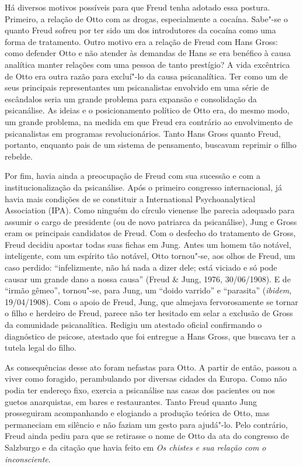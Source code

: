 Há diversos motivos possíveis para que Freud tenha adotado essa postura.
Primeiro, a relação de Otto com as drogas, especialmente a cocaína.
Sabe"-se o quanto Freud sofreu por ter sido um dos introdutores da
cocaína como uma forma de tratamento. Outro motivo era a relação de
Freud com Hans Gross: como defender Otto e não atender às demandas de
Hans se era benéfico à causa analítica manter relações com uma pessoa de
tanto prestígio? A vida excêntrica de Otto era outra razão para
excluí"-lo da causa psicanalítica. Ter como um de seus principais
representantes um psicanalistas envolvido em uma série de escândalos
seria um grande problema para expansão e consolidação da psicanálise. As
ideias e o posicionamento político de Otto era, do mesmo modo, um grande
problema, na medida em que Freud era contrário ao envolvimento de
psicanalistas em programas revolucionários. Tanto Hans Gross quanto
Freud, portanto, enquanto pais de um sistema de pensamento, buscavam
reprimir o filho rebelde.

Por fim, havia ainda a preocupação de Freud com sua sucessão e com a
institucionalização da psicanálise. Após o primeiro congresso
internacional, já havia mais condições de se constituir a International
Psychoanalytical Association (IPA). Como ninguém do círculo vienense lhe
parecia adequado para assumir o cargo de presidente (ou de novo
patriarca da psicanálise), Jung e Gross eram os principais candidatos de
Freud. Com o desfecho do tratamento de Gross, Freud decidiu apostar
todas suas fichas em Jung. Antes um homem tão notável, inteligente, com
um espírito tão notável, Otto tornou"-se, aos olhos de Freud, um caso
perdido: ``infelizmente, não há nada a dizer dele; está viciado e só
pode causar um grande dano a nossa causa'' (Freud \& Jung, 1976,
30/06/1908). E de ``irmão gêmeo'', tornou"-se, para Jung, um ``doido
varrido'' e ``parasita'' (\emph{ibidem}, 19/04/1908). Com o apoio de
Freud, Jung, que almejava fervorosamente se tornar o filho e herdeiro de
Freud, parece não ter hesitado em selar a exclusão de Gross da
comunidade psicanalítica. Redigiu um atestado oficial confirmando o
diagnóstico de psicose, atestado que foi entregue a Hans Gross, que
buscava ter a tutela legal do filho.

As consequências desse ato foram nefastas para Otto. A partir de então,
passou a viver como foragido, perambulando por diversas cidades da
Europa. Como não podia ter endereço fixo, exercia a psicanálise nas
casas dos pacientes ou nos guetos anarquistas, em bares e restaurantes.
Tanto Freud quanto Jung prosseguiram acompanhando e elogiando a produção
teórica de Otto, mas permaneciam em silêncio e não faziam um gesto para
ajudá"-lo. Pelo contrário, Freud ainda pediu para que se retirasse o nome
de Otto da ata do congresso de Salzburgo e da citação que havia feito em
\emph{Os chistes e sua relação com o inconsciente}.

